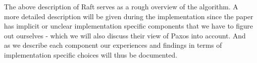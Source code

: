 The above description of Raft serves as a rough overview of the algorithm. A more detailed description will be given during the implementation since the paper has implicit or unclear implementation specific components that we have to figure out ourselves - which we will also discuss  their view of Paxos into account. And as we describe each component our experiences and findings in terms of implementation specific choices will thus be documented. 
